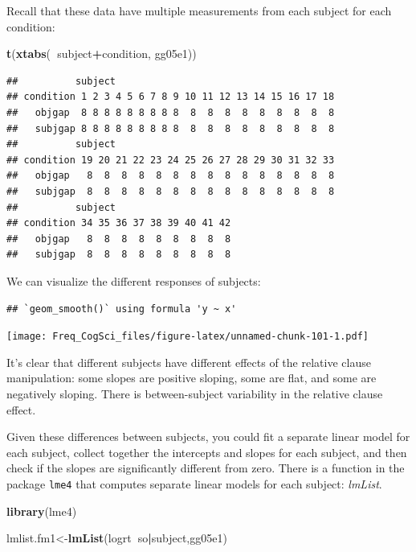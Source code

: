 \documentclass[12pt,]{krantz}
\newenvironment{Shaded}{\begin{snugshade}}{\end{snugshade}}
\newcommand{\KeywordTok}[1]{\textcolor[rgb]{0.13,0.29,0.53}{\textbf{#1}}}
\newcommand{\NormalTok}[1]{#1}
\newcommand{\OperatorTok}[1]{\textcolor[rgb]{0.81,0.36,0.00}{\textbf{#1}}}
\begin{document}
Recall that these data have multiple measurements from each subject for each condition:

\begin{Shaded}
\begin{Highlighting}[]
\KeywordTok{t}\NormalTok{(}\KeywordTok{xtabs}\NormalTok{(}\OperatorTok{~}\NormalTok{subject}\OperatorTok{+}\NormalTok{condition, gg05e1))}
\end{Highlighting}
\end{Shaded}

\begin{verbatim}
##          subject
## condition 1 2 3 4 5 6 7 8 9 10 11 12 13 14 15 16 17 18
##   objgap  8 8 8 8 8 8 8 8 8  8  8  8  8  8  8  8  8  8
##   subjgap 8 8 8 8 8 8 8 8 8  8  8  8  8  8  8  8  8  8
##          subject
## condition 19 20 21 22 23 24 25 26 27 28 29 30 31 32 33
##   objgap   8  8  8  8  8  8  8  8  8  8  8  8  8  8  8
##   subjgap  8  8  8  8  8  8  8  8  8  8  8  8  8  8  8
##          subject
## condition 34 35 36 37 38 39 40 41 42
##   objgap   8  8  8  8  8  8  8  8  8
##   subjgap  8  8  8  8  8  8  8  8  8
\end{verbatim}

We can visualize the different responses of subjects:

\begin{verbatim}
## `geom_smooth()` using formula 'y ~ x'
\end{verbatim}

\texttt{[image: Freq\_CogSci\_files/figure-latex/unnamed-chunk-101-1.pdf]}

It's clear that different subjects have different effects of the relative clause manipulation: some slopes are positive sloping, some are flat, and some are negatively sloping. There is between-subject variability in the relative clause effect.

Given these differences between subjects, you could fit a separate linear model for each subject, collect together the intercepts and slopes for each subject, and then check if the slopes are significantly different from zero. There is a function in the package \texttt{lme4} that computes separate linear models for each subject: \emph{lmList}.

\begin{Shaded}
\begin{Highlighting}[]
\KeywordTok{library}\NormalTok{(lme4)}

\NormalTok{lmlist.fm1<-}\KeywordTok{lmList}\NormalTok{(logrt}\OperatorTok{~}\NormalTok{so}\OperatorTok{|}\NormalTok{subject,gg05e1)}
\end{Highlighting}
\end{Shaded}
\end{document}

